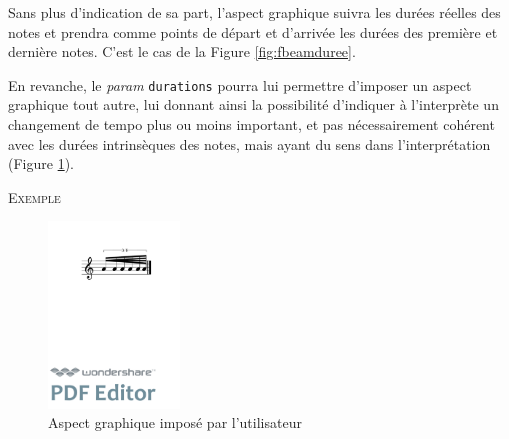 \documentclass{article}
\newenvironment{gmncode}	{\vspace{-2mm}\small\verbatim}{\endverbatim\vspace{-2mm}}
\newcommand{\code}[1]		{{\small \texttt{#1}}}
\newcommand{\exemple}		{\vspace{2mm}\hspace*{-6mm}\textsc{Exemple}}
\begin{document}
Sans plus d'indication de sa part, l'aspect graphique suivra les durées réelles des notes et prendra comme points de départ et d'arrivée les durées des première et dernière notes.  C'est le cas de la Figure \ref{fig:fbeamduree}.

En revanche, le \emph{param} \code{durations} pourra lui permettre d'imposer un aspect graphique tout autre, lui donnant ainsi la possibilité d'indiquer à l'interprète un changement de tempo plus ou moins important, et pas nécessairement cohérent avec les durées intrinsèques des notes, mais ayant du sens dans l'interprétation (Figure \ref{fig:utilisateur}).

\exemple
\begin{figure}[h]
\centering
\begin{gmncode}
[ 
  \fBeam<durations="1/16,1/64", 
      drawDuration="true">
   (a/8 a/16 a a a/32 a) 
]
\end{gmncode}

\includegraphics[width=35mm]{img/durations.pdf}
\caption{Aspect graphique imposé par l'utilisateur}
\label{fig:utilisateur}
\end{figure}
\end{document}
